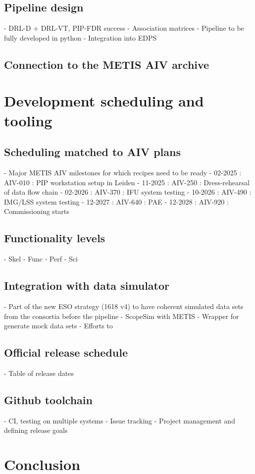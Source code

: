 \documentclass[]{spie}  %
\begin{document}
\subsection{Pipeline design}
	- DRL-D + DRL-VT, PIP-FDR success
	- Association matrices
	- Pipeline to be fully developed in python 
	- Integration into EDPS
\subsection{Connection to the METIS AIV archive}


\section{Development scheduling and tooling}
\label{sec:development}

\subsection{Scheduling matched to AIV plans}
\label{ssec:dev_aiv}
	- Major METIS AIV milestones for which recipes need to be ready
		- 02-2025 : AIV-010 : PIP workstation setup in Leiden
		- 11-2025 : AIV-250 : Dress-rehearsal of data flow chain
		- 02-2026 : AIV-370 : IFU system testing
		- 10-2026 : AIV-490 : IMG/LSS system testing
		- 12-2027 : AIV-640 : PAE
		- 12-2028 : AIV-920 : Commissioning starts
\subsection{Functionality levels}
\label{ssec:dev_levels}
	- Skel
	- Func
	- Perf
	- Sci
\subsection{Integration with data simulator}
\label{ssec:dev_scopesim}
	- Part of the new ESO strategy (1618 v4) to have coherent simulated data sets from the consortia before the pipeline 
	- ScopeSim with METIS
	- Wrapper for generate mock data sets
	- Efforts to 
\subsection{Official release schedule}
\label{ssec:dev_releases}
	- Table of release dates
\subsection{Github toolchain}
\label{ssec:dev_testing}
	- CI, testing on multiple systems
	- Issue tracking
	- Project management and defining release goals

\section{Conclusion}
\label{sec:conclusion}






\appendix    %

\acknowledgments %

\end{document}
